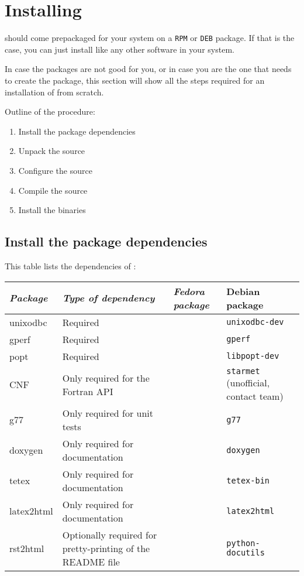 \section {Installing \dballe{} }

\dballe{} should come prepackaged for your system on a {\tt RPM} or {\tt DEB}
package.  If that is the case, you can just install \dballe{} like any other
software in your system.

In case the packages are not good for you, or in case you are the one that
needs to create the package, this section will show all the steps required for
an installation of \dballe{} from scratch.

Outline of the procedure:

\begin{enumerate}
\item Install the package dependencies
\item Unpack the source
\item Configure the source
\item Compile the source
\item Install the binaries
\end{enumerate}

\subsection{Install the package dependencies}

This table lists the dependencies of \dballe{}:

\begin{tabular}{|l|l|l|l|}
\hline
{\em Package} & {\em Type of dependency} & {\em Fedora package} & {\rm Debian package} \\
\hline
unixodbc   & Required                        & {\tt } & {\tt unixodbc-dev} \\
gperf      & Required                        & {\tt } & {\tt gperf} \\
popt       & Required                        & {\tt } & {\tt libpopt-dev} \\
CNF        & Only required for the Fortran API & {\tt } & {\tt starmet} (unofficial, contact \dballe{} team) \\
g77        & Only required for unit tests    & {\tt } & {\tt g77} \\
doxygen	   & Only required for documentation & {\tt } & {\tt doxygen} \\
tetex      & Only required for documentation & {\tt } & {\tt tetex-bin} \\
latex2html & Only required for documentation & {\tt } & {\tt latex2html} \\
rst2html   & Optionally required for pretty-printing of the README file & {\tt } & {\tt python-docutils} \\
\end{tabular}


